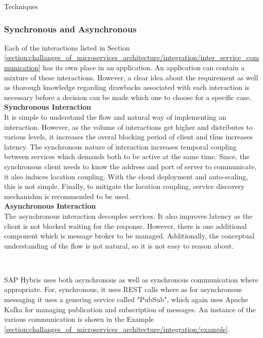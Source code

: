 \begin{shaded}Techniques\end{shaded}
\subsubsection{Synchronous and Asynchronous}\label{section:challanges_of_microservices_architecture/integration/synchronous_and_asynchronous}
Each of the interactions listed in Section \ref{section:challanges_of_microservices_architecture/integration/inter_service_communication} has its own place in an application. An application can contain a mixture of these interactions. However, a clear idea about the requirement as well as thorough knowledge regarding drawbacks associated with each interaction is necessary before a decision can be made which one to choose for a specific case.\cite{Newman:2015aa}\cite{Richardson:2014aa}\cite{Morris:2015aa}\\
\textbf{Synchronous Interaction}
\\
It is simple to understand the flow and natural way of implementing an interaction. However, as the volume of interactions get higher and distributes to various levels, it increases the overal blocking period of client and thus increases latency. The synchronous nature of interaction increases temporal coupling between services which demands both to be active at the same time. Since, the synchronous client needs to know the address and port of server to communicate, it also induces location coupling. With the cloud deployment and auto-scaling, this is not simple. Finally, to mitigate the location coupling, service discovery mechanishm is recommended to be used.
\\
  
\textbf{Asynchronous Interaction}
\\
The asynchronous interaction decouples services. It also improves latency as the client is not blocked waiting for the response. However, there is one additional component which is message broker to be managed. Additionally, the conceptual understanding of the flow is not natural, so it is not easy to reason about.

\\
\begin{shaded}
SAP Hybris uses both asynchronous as well as synchronous communication where appropriate. For, synchronous, it uses \acrshort{REST} calls where as for asynchronous messaging it uses a genering service called "PubSub", which again uses Apache Kafka for managing publication and subscription of messages. An instance of the various communication is shown in the Example \ref{section:challanges_of_microservices_architecture/integration/example}. 
\end{shaded}
